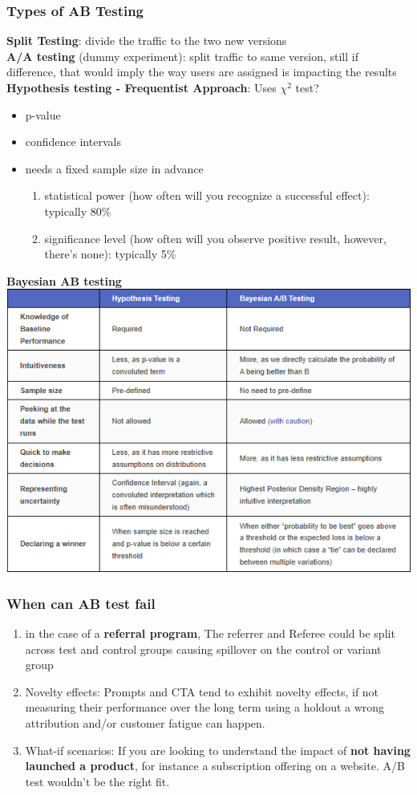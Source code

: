 \documentclass{beamer}
\begin{document}
\begin{frame}[allowframebreaks]\frametitle{Types of AB Testing}
\textbf{Split Testing}: divide the traffic to the two new versions\\
\textbf{A/A testing} (dummy experiment): 
split traffic to same version, still if difference, that would imply the way users are assigned is impacting the results\\
\textbf{Hypothesis testing - Frequentist Approach}:
Uses $\chi^2$ test?\\
\begin{itemize}
	\item p-value
	\item confidence intervals
	\item needs a fixed sample size in advance
	\begin{enumerate}
		\item statistical power (how often will you recognize a successful effect): typically 80\%
		\item significance level (how often will you observe positive result, however, there's none): typically 5\%
	\end{enumerate}
\end{itemize}
\textbf{Bayesian AB testing}\\
\includegraphics[scale=0.5]{figs/hypothesisBayesian}
\end{frame}


\begin{frame}\frametitle{When can AB test fail}
\begin{enumerate}
	\item in the case of a \textbf{referral program}, The referrer and Referee could be split across test and control groups causing spillover on the control or variant group
	\item Novelty effects: Prompts and CTA tend to exhibit novelty effects, if not measuring their performance over the long term using a holdout a wrong attribution and/or customer fatigue can happen.
	\item What-if scenarios: If you are looking to understand the impact of \textbf{not having launched a product}, for instance a subscription offering on a website. A/B test wouldn’t be the right fit.
\end{enumerate}
\end{frame}
\end{document}
